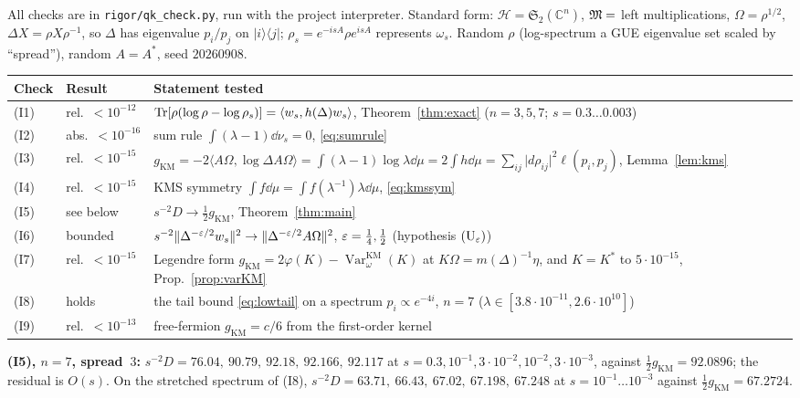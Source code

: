 \documentclass[11pt]{article}
\newcommand{\Hil}{\mathcal H}\newcommand{\Om}{\Omega}
\newcommand{\ip}[2]{\langle#1,#2\rangle}\newcommand{\norm}[1]{\lVert#1\rVert}
\newcommand{\gKM}{g_{\mathrm{KM}}}\newcommand{\gB}{g_{\mathrm B}}
\begin{document}
All checks are in \texttt{rigor/qk\_check.py}, run with the project interpreter.  Standard form:
$\Hil=\mathfrak S_2(\mathbb C^n)$, $\mathfrak M=$ left multiplications, $\Om=\rho^{1/2}$, $\Delta X=\rho X\rho^{-1}$,
so $\Delta$ has eigenvalue $p_i/p_j$ on $\lvert i\rangle\langle j\rvert$; $\rho_s=e^{-isA}\rho e^{isA}$
represents $\omega_s$.  Random $\rho$ (log-spectrum a GUE eigenvalue set scaled by ``spread''), random
$A=A^*$, seed $20260908$.

\begin{center}\small
\begin{tabular}{@{}llp{}@{}}\toprule
\textbf{Check} & \textbf{Result} & \textbf{Statement tested}\\\midrule
(I1) & rel.\ $<10^{-12}$ & $\Tr[\rho(\log\rho-\log\rho_s)]=\ip{w_s}{h(\Delta)w_s}$,
 Theorem~\ref{thm:exact} ($n=3,5,7$; $s=0.3\dots0.003$)\\
(I2) & abs.\ $<10^{-16}$ & sum rule $\int(\lambda-1)\dd\nu_s=0$, \eqref{eq:sumrule}\\
(I3) & rel.\ $<10^{-15}$ & $\gKM=-2\ip{A\Om}{\log\Delta A\Om}=\int(\lambda-1)\log\lambda\dd\mu
 =2\int h\dd\mu=\sum_{ij}\lvert d\rho_{ij}\rvert^2\ell(p_i,p_j)$, Lemma~\ref{lem:kms}\\
(I4) & rel.\ $<10^{-15}$ & KMS symmetry $\int f\dd\mu=\int f(\lambda^{-1})\lambda\dd\mu$, \eqref{eq:kmssym}\\
(I5) & see below & $s^{-2}D\to\frac12\gKM$, Theorem~\ref{thm:main}\\
(I6) & bounded & $s^{-2}\norm{\Delta^{-\eps/2}w_s}^2\to\norm{\Delta^{-\eps/2}A\Om}^2$, $\varepsilon=\frac14,\frac12$
 (hypothesis $(\mathrm U_\varepsilon)$)\\
(I7) & rel.\ $<10^{-15}$ & Legendre form $\gKM=2\varphi(K)-\operatorname{Var}^{\mathrm{KM}}_\omega(K)$ at
 $K\Om=m(\Delta)^{-1}\eta$, and $K=K^*$ to $5\cdot10^{-15}$, Prop.~\ref{prop:varKM}\\
(I8) & holds & the tail bound \eqref{eq:lowtail} on a spectrum $p_i\propto e^{-4i}$, $n=7$
 ($\lambda\in[3.8\cdot10^{-11},2.6\cdot10^{10}]$)\\
(I9) & rel.\ $<10^{-13}$ & free-fermion $\gKM=c/6$ from the first-order kernel\\\bottomrule
\end{tabular}
\end{center}

\textbf{(I5), $n=7$, spread~$3$:} $s^{-2}D=76.04,\ 90.79,\ 92.18,\ 92.166,\ 92.117$ at
$s=0.3,10^{-1},3\cdot10^{-2},10^{-2},3\cdot10^{-3}$, against $\frac12\gKM=92.0896$; the residual is
$O(s)$.  On the stretched spectrum of (I8), $s^{-2}D=63.71,\ 66.43,\ 67.02,\ 67.198,\ 67.248$ at
$s=10^{-1}\dots10^{-3}$ against $\frac12\gKM=67.2724$.
\end{document}
